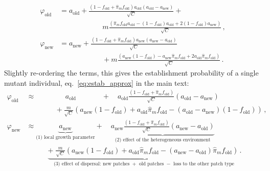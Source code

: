 \documentclass[11pt]{article}
\begin{document}
\begin{equation}
\begin{aligned}
\varphi_{\text{old}} &= a_{\text{old}} + \frac{(1-f_{\text{old}}+\widehat{\pi}_m f_{\text{old}})a_{\text{old}} \left(a_{\text{old}}-a_{\text{new}}\right)}{\sqrt{C}}  + \\
&\qquad \qquad \qquad m \frac{\left(\widehat{\pi}_m f_{\text{old}} a_{\text{old}} - (1-f_{\text{old}}) a_{\text{old}} + 2 (1-f_{\text{old}}) a_{\text{new}}  \right)}{\sqrt{C}}\, ,\\
\varphi_{\text{new}} &= a_{\text{new}} + \frac{(1-f_{\text{old}}+\widehat{\pi}_m f_{\text{old}})a_{\text{new}} \left(a_{\text{new}} - a_{\text{old}}\right)}{\sqrt{C}} \\
&\qquad \qquad \qquad + m \frac{\left(a_{\text{new}} (1-f_{\text{old}}) - a_{\text{new}} \widehat{\pi}_m f_{\text{old}} + 2 a_{\text{old}} \widehat{\pi}_m f_{\text{old}}  \right)}{\sqrt{C}}\, .
\end{aligned}
\end{equation}
%
Slightly re-ordering the terms, this gives the establishment probability of a single mutant individual, eq.~\eqref{eq:estab_approx} in the main text:
\begin{equation}\label{Seq:estab_approx}
\begin{aligned}
\varphi_{\text{old}} &\approx \qquad \quad \; \; \; \; a_{\text{old}} \qquad \quad \;  \; +  \quad a_{\text{old}} \frac{\left(1-f_{\text{old}}+\widehat{\pi}_m f_{\text{old}}\right)}{\sqrt{C}}(a_{\text{old}}-a_{\text{new}}) \\
& \qquad \qquad + \frac{m}{\sqrt{C}} \left(a_{\text{new}}(1-f_{\text{old}}) + a_{\text{old}}\widehat{\pi}_m f_{\text{old}} - (a_{\text{old}}-a_{\text{new}})(1-f_{\text{old}})\right) \, ,\\
\varphi_{\text{new}} &\approx \underbrace{ a_{\text{new}}}_{\text{(1) local growth parameter}} +  \quad \underbrace{ a_{\text{new}} \frac{\left(1-f_{\text{old}}+\widehat{\pi}_m f_{\text{old}}\right)}{\sqrt{C}}(a_{\text{new}}-a_{\text{old}})}_{\text{(2) effect of the heterogeneous environment}} \\
& \qquad \quad \underbrace{+\; \frac{m}{\sqrt{C}}\left( a_{\text{new}}(1-f_{\text{old}}) + a_{\text{old}} \widehat{\pi}_m f_{\text{old}} - (a_{\text{new}}-a_{\text{old}}) \widehat{\pi}_m f_{\text{old}} \right)\, .}_{\text{(3) effect of dispersal: new patches $+$ old patches $-$ loss to the other patch type }}
\end{aligned}
\end{equation}
\end{document}
